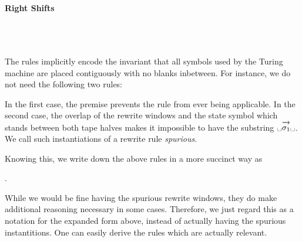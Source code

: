 \paragraph{Right Shifts}
\begin{center}
  \quad \trewwin{\blank}{\blank}{\blank}{\polpos{\blank}}{\polpos{\blank}}{\polpos{\blank}}
  \\
  \quad {} {\polpos{\blank}}
\quad {}
 \\
  \quad {} {\polpos{\blank}}{\polpos{\blank}}{ } 
\quad {}
\end{center}

The rules implicitly encode the invariant that all symbols used by the Turing machine are placed contiguously with no blanks inbetween. For instance, we do not need the following two rules:
\begin{center}
  \quad
\end{center}
In the first case, the premise prevents the rule from ever being applicable. In the second case, the overlap of the rewrite windows and the state symbol which stands between both tape halves makes it impossible to have the substring $\blank \polpos{\sigma_1} \blank$. 
We call such instantiations of a rewrite rule \emph{spurious}.

Knowing this, we write down the above rules in a more succinct way as 
\begin{center}
  .
\end{center}
While we would be fine having the spurious rewrite windows, they do make additional reasoning necessary in some cases. Therefore, we just regard this as a notation for the expanded form above, instead of actually having the spurious instantitions. One can easily derive the rules which are actually relevant.

